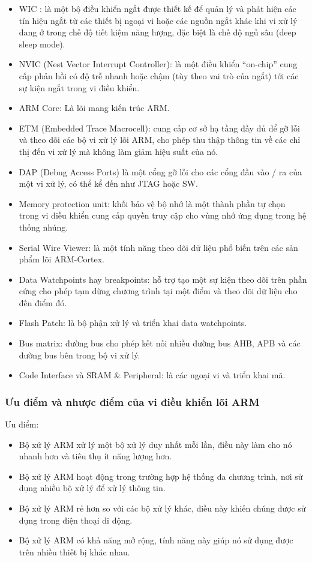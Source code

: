 \documentclass{article} %
\begin{document}
	\begin{itemize}
		\item WIC : là một bộ điều khiển ngắt được thiết kế để quản lý và phát hiện các tín hiệu ngắt từ các thiết bị ngoại vi hoặc các nguồn ngắt khác khi vi xử lý đang ở trong chế độ tiết kiệm năng lượng, đặc biệt là chế độ ngủ sâu (deep sleep mode).
		\item NVIC (Nest Vector Interrupt Controller): là một điều khiển “on-chip” cung cấp phản hồi có độ trễ nhanh hoặc chậm (tùy theo vai trò của ngắt) tới các sự kiện ngắt trong vi điều khiển.
		\item ARM Core: Là lõi mang kiến trúc ARM.
		\item ETM (Embedded Trace Macrocell): cung cấp cơ sở hạ tầng đầy đủ để gỡ lỗi và theo dõi các bộ vi xử lý lõi ARM, cho phép thu thập thông tin về các chỉ thị đến vi xử lý mà không làm giảm hiệu suất của nó.
		\item DAP (Debug Access Ports) là một cổng gỡ lỗi cho các cổng đầu vào / ra của một vi xử lý, có thể kể đến như JTAG hoặc SW.
		\item Memory protection unit: khối bảo vệ bộ nhớ là một thành phần tự chọn trong vi điều khiển cung cấp quyền truy cập cho vùng nhớ ứng dụng trong hệ thống nhúng.
		\item Serial Wire Viewer: là một tính năng theo dõi dữ liệu phổ biến trên các sản phẩm lõi ARM-Cortex.
		\item Data Watchpoints hay breakpoints: hỗ trợ tạo một sự kiện theo dõi trên phần cứng cho phép tạm dừng chương trình tại một điểm và theo dõi dữ liệu cho đến điểm đó.
		\item Flash Patch: là bộ phận xử lý và triển khai data watchpoints.
		\item Bus matrix: đường bus cho phép kết nối nhiều đường bus AHB, APB và các đường bus bên trong bộ vi xử lý.
		\item Code Interface và SRAM \& Peripheral:  là các ngoại vi và triển khai mã.
	\end{itemize}
	
	\subsubsection{Ưu điểm và nhược điểm của vi điều khiển lõi ARM}
	
	Ưu điểm:
	\begin{itemize}
		\item Bộ xử lý ARM xử lý một bộ xử lý duy nhất mỗi lần, điều này làm cho nó nhanh hơn và tiêu thụ ít năng lượng hơn.
		\item Bộ xử lý ARM hoạt động trong trường hợp hệ thống đa chương trình, nơi sử dụng nhiều bộ xử lý để xử lý thông tin.
		\item Bộ xử lý ARM rẻ hơn so với các bộ xử lý khác, điều này khiến chúng được sử dụng trong điện thoại di động.
		\item Bộ xử lý ARM có khả năng mở rộng, tính năng này giúp nó sử dụng được trên nhiều thiết bị khác nhau.
	\end{itemize}
	
\end{document}
